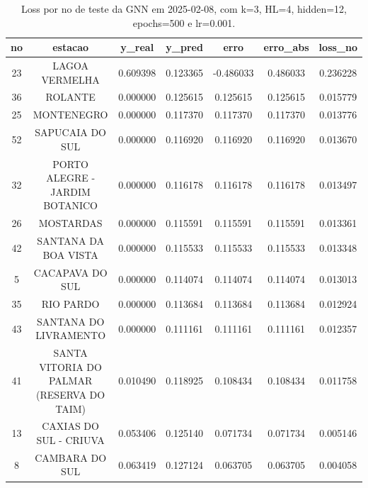 \begin{table}[h]
\centering
\caption{Loss por no de teste da GNN em 2025-02-08, com k=3, HL=4, hidden=12, epochs=500 e lr=0.001.}
\label{tab:gnn_loss_k3_hl4_h12_e500_d20250208}
\begin{tabular}{ccccccc}
\toprule
no & estacao & y\_real & y\_pred & erro & erro\_abs & loss\_no \\
\midrule
23 & LAGOA VERMELHA & 0.609398 & 0.123365 & -0.486033 & 0.486033 & 0.236228 \\
36 & ROLANTE & 0.000000 & 0.125615 & 0.125615 & 0.125615 & 0.015779 \\
25 & MONTENEGRO & 0.000000 & 0.117370 & 0.117370 & 0.117370 & 0.013776 \\
52 & SAPUCAIA DO SUL & 0.000000 & 0.116920 & 0.116920 & 0.116920 & 0.013670 \\
32 & PORTO ALEGRE - JARDIM BOTANICO & 0.000000 & 0.116178 & 0.116178 & 0.116178 & 0.013497 \\
26 & MOSTARDAS & 0.000000 & 0.115591 & 0.115591 & 0.115591 & 0.013361 \\
42 & SANTANA DA BOA VISTA & 0.000000 & 0.115533 & 0.115533 & 0.115533 & 0.013348 \\
5 & CACAPAVA DO SUL & 0.000000 & 0.114074 & 0.114074 & 0.114074 & 0.013013 \\
35 & RIO PARDO & 0.000000 & 0.113684 & 0.113684 & 0.113684 & 0.012924 \\
43 & SANTANA DO LIVRAMENTO & 0.000000 & 0.111161 & 0.111161 & 0.111161 & 0.012357 \\
41 & SANTA VITORIA DO PALMAR (RESERVA DO TAIM) & 0.010490 & 0.118925 & 0.108434 & 0.108434 & 0.011758 \\
13 & CAXIAS DO SUL - CRIUVA & 0.053406 & 0.125140 & 0.071734 & 0.071734 & 0.005146 \\
8 & CAMBARA DO SUL & 0.063419 & 0.127124 & 0.063705 & 0.063705 & 0.004058 \\
\bottomrule
\end{tabular}
\end{table}
